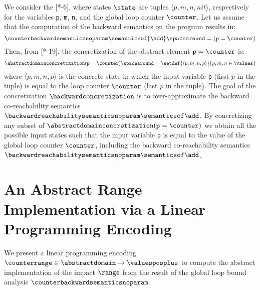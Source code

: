 \begin{example}
  We consider the [*-6], where states $\state$ are tuples $\langle p, m, n, nit\rangle$, respectively for the variables \texttt{p}, \texttt{m}, \texttt{n}, and the global loop counter $\counter$.
  Let us assume that the computation of the backward semantics on the program \add{} results in:
  \[
    \counterbackwardsemanticsnoparam\semanticsof{\add} \spacearound=
    (\texttt{p} = \counter)
  \]
  Then, from [*-19], the concretization of the abstract element $\texttt{p} = \counter$ is:
  \begin{align*}
    \abstractdomainconcretization(\texttt{p} = \counter) \spacearound= \setdef{\langle p, m, n, p\rangle}{p, m, n\in\values}
\end{align*}
where $\langle p, m, n, p\rangle$ is the concrete state in which the input variable \texttt{p} (first $p$ in the tuple) is equal to the loop counter $\counter$ (last $p$ in the tuple).
The goal of the concretization $\backwardconcretization$ is to over-approximate the backward co-reachability semantics $\backwardreachabilitysemanticsnoparam\semanticsof\add$.
By concretizing any subset of $\abstractdomainconcretization(\texttt{p} = \counter)$ we obtain all the possible input states such that the input variable \texttt{p} is equal to the value of the global loop counter $\counter$, including the backward co-reachability semantics $\backwardreachabilitysemanticsnoparam\semanticsof\add$.
\end{example}


\section{An Abstract Range Implementation via a Linear Programming Encoding}

We present a linear programming encoding $\counterrange\in\abstractdomain\to\valuesposplus$ to compute the abstract implementation of the impact $\range$ from the result of the global loop bound analysis $\counterbackwardsemanticsnoparam$.

